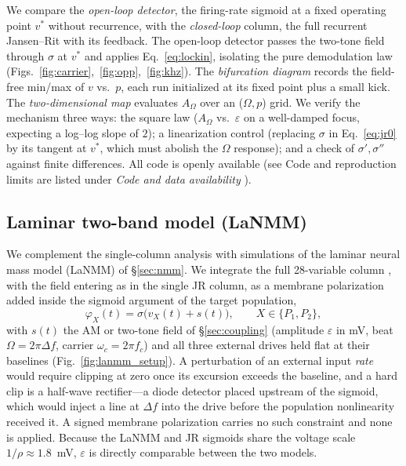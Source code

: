 \documentclass[11pt,a4paper]{article}
\newcommand{\Sig}{\sigma}
\providecommand{\DIFaddtex}[1]{{\protect\color{blue} \sf #1}} %
\providecommand{\DIFdeltex}[1]{{\protect\color{red} \scriptsize #1}} %
\providecommand{\DIFaddbegin}{} %
\providecommand{\DIFaddend}{} %
\providecommand{\DIFdelbegin}{} %
\providecommand{\DIFdelend}{} %
\providecommand{\DIFadd}[1]{\texorpdfstring{\DIFaddtex{#1}}{#1}} %
\providecommand{\DIFdel}[1]{\texorpdfstring{\DIFdeltex{#1}}{}} %
\begin{document}
We compare the \emph{open-loop detector}, the firing-rate sigmoid at a fixed
operating point $v^*$ without recurrence, with the \emph{closed-loop} column, the full recurrent
Jansen--Rit with its feedback. The open-loop detector passes the two-tone field through
$\Sig$ at $v^*$ and applies Eq.~\eqref{eq:lockin}, isolating the pure demodulation law
(Figs.~\ref{fig:carrier},~\ref{fig:opp},~\ref{fig:khz}). The \emph{bifurcation
diagram} records the field-free min/max of $v$ vs.\ $p$, each run initialized at
its fixed point plus a small kick. The \emph{two-dimensional map} evaluates
$A_\Omega$ over an ($\Omega,p$) grid. We verify the mechanism three ways: the
square law ($A_\Omega$ vs.\ $\varepsilon$ on a well-damped focus, expecting a
log--log slope of $2$); a linearization control (replacing $\Sig$ in
Eq.~\eqref{eq:jr0} by its tangent at $v^*$, which must abolish the $\Omega$
response); and a check of $\Sig',\Sig''$ against finite differences. \DIFdelbegin \DIFdel{All code is
openly available (see }\DIFdelend \DIFaddbegin \DIFadd{Code and reproduction limits are listed under }\DIFaddend \emph{Code and data availability}\DIFdelbegin \DIFdel{)}\DIFdelend .

\subsection{Laminar two-band model (LaNMM)}
We complement the single-column analysis with simulations of the laminar neural
mass model (LaNMM) of \S\ref{sec:nmm}. We integrate the full 28-variable column
\cite{ruffini2025cfc,sanchezTodo2023}, with the field entering as in the single
JR column, as a membrane polarization added inside the sigmoid argument of the target
population,
\begin{equation}
\varphi_X(t)=\Sig\!\big(v_X(t)+s(t)\big),\qquad X\in\{P_1,P_2\},
\label{eq:lanmm_drive}
\end{equation}
with $s(t)$ the AM or two-tone field of \S\ref{sec:coupling} (amplitude $\varepsilon$ in
mV, beat $\Omega=2\pi\Delta f$, carrier $\omega_c=2\pi f_c$) and all three external drives
held flat at their baselines (Fig.~\ref{fig:lanmm_setup}). A perturbation of an external
input \emph{rate} would require clipping at zero
once its excursion exceeds the baseline, and a hard clip is a half-wave rectifier---a
diode detector placed upstream of the sigmoid, which would inject a line at $\Delta f$
into the drive before the population nonlinearity received it. A signed membrane
polarization carries no such constraint and none is applied. Because the LaNMM and JR
sigmoids share the voltage scale $1/\rho\approx1.8$~mV, $\varepsilon$ is directly
comparable between the two models.
\end{document}
